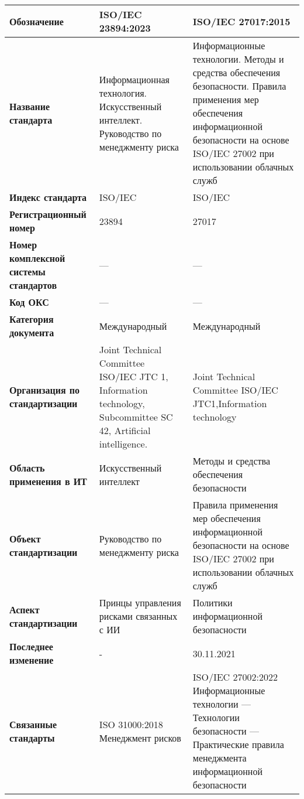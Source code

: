 \begin{table}[h!tp]
	\small
	\centering
	\caption{}
	\label{table:international}
	\begin{tabular}{|p{10em}|p{14em}|p{14em}|}
		\hline
		\textbf{Обозначение}
			& \textbf{ISO/IEC 23894:2023} & \textbf{ISO/IEC 27017:2015} \\ \hline
		\textbf{Название стандарта}
				& Информационная технология. Искусственный интеллект. Руководство по менеджменту риска
				& Информационные технологии. Методы и средства обеспечения безопасности. Правила применения мер обеспечения информационной безопасности на основе ISO/IEC 27002 при использовании облачных служб \\ \hline
		\textbf{Индекс стандарта}
			& ISO/IEC & ISO/IEC \\ \hline
		\textbf{Регистрационный номер}
			& 23894 & 27017 \\ \hline
		\textbf{Номер комплексной системы стандартов}
			& --- & --- \\ \hline
		\textbf{Код ОКС}
			& --- & --- \\ \hline
		\textbf{Категория документа}
			& Международный
			& Международный \\ \hline
		\textbf{Организация по стандартизации}
			& Joint Technical Committee ISO/IEC JTC 1, Information technology, Subcommittee SC 42, Artificial intelligence.
			& Joint Technical Committee ISO/IEC JTC1,Information technology \\ \hline
		\textbf{Область применения в ИТ}
			& Искусственный интеллект
			& Методы и средства обеспечения безопасности \\ \hline
		\textbf{Объект стандартизации}
			& Руководство по менеджменту риска
			&  Правила применения мер обеспечения информационной безопасности на основе ISO/IEC 27002 при использовании облачных служб \\ \hline
		\textbf{Аспект стандартизации}
			& Принцы управления рисками связанных с  ИИ
			& Политики информационной безопасности \\ \hline
		\textbf{Последнее изменение} & - & 30.11.2021 \\ \hline
		\textbf{Связанные стандарты}
		& ISO 31000:2018 Менеджмент рисков
		& ISO/IEC 27002:2022 Информационные технологии — Технологии безопасности — Практические правила менеджмента информационной безопасности \\ \hline
	\end{tabular}
\end{table}

